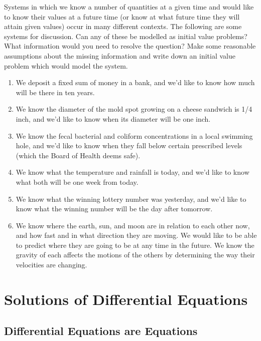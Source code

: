 Systems in which we know a number of quantities at a given time and
would like to know their values at a future time (or know at what
future time they will attain given values) occur in many different
contexts.  The following are some systems for discussion.  Can any of
these be modelled as initial value problems?  What information would
you need to resolve the question?  Make some reasonable assumptions
about the missing information and write down an initial value problem
which would model the system.


\begin{enumerate}
\item We deposit a fixed sum of money in a bank, and we'd like to know
how much will be there in ten years.


\item We know the diameter of the mold spot growing on a cheese
sandwich is 1/4 inch, and we'd like to know when its diameter will be
one inch.


\item We know the fecal bacterial and coliform concentrations in a
local swimming hole, and we'd like to know when they fall below
certain prescribed levels (which the Board of Health deems safe).


\item We know what the temperature and rainfall is today, and we'd like
to know what both will be one week from today.


\item We know what the winning lottery number was yesterday, and we'd
like to know what the winning number will be the day after tomorrow.


\item We know where the earth, sun, and moon are in relation to each
other now, and how fast and in what direction they are moving.  We
would like to be able to predict where they are going to be at any
time in the future.  We know the gravity of each affects the motions
of the others by determining the way their velocities are changing.


\end{enumerate}
\section{Solutions of Differential Equations}
\label{sec:solutions-of-differential-equations}

\subsection{Differential Equations are Equations}
\label{subsec:differential-equations-are-equations}

